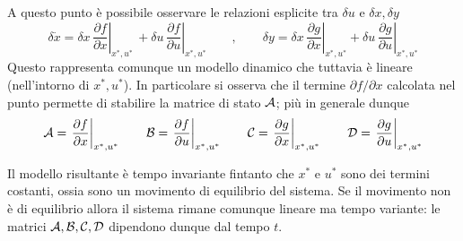  	A questo punto è possibile osservare le relazioni esplicite tra $\delta u$ e $\delta x, \delta y$
 	\[ \delta \dot x = \delta x \,\left. \frac{\partial f}{\partial x} \right|_{x^*,u^*}\, + \delta u \,\left. \frac{\partial f}{\partial u} \right|_{x^*,u^*} \qquad , \qquad 
 	\delta y = \delta x\,\left. \frac{\partial g}{\partial x} \right|_{x^*,u^*} + \delta u\,\left. \frac{\partial g}{\partial u} \right|_{x^*,u^*} \]
 	Questo rappresenta comunque un modello dinamico che tuttavia è lineare (nell'intorno di $x^*, u^*$). In particolare si osserva che il termine $\partial f  /\partial x$ calcolata nel punto permette di stabilire la matrice di stato $\mathcal A$; più in generale dunque
 	\[ \mathcal A= \left. \frac{\partial f}{\partial x} \right|_{x^*,u^*} \qquad \mathcal B =\left. \frac{\partial f}{\partial u} \right|_{x^*,u^*} \qquad \mathcal C = \left. \frac{\partial g}{\partial x} \right|_{x^*,u^*} \qquad \mathcal D= \left. \frac{\partial g}{\partial u} \right|_{x^*,u^*}\]
 	
 	Il modello risultante è tempo invariante fintanto che $x^*$ e $u^*$ sono dei termini costanti, ossia sono un movimento di equilibrio del sistema. Se il movimento non è di equilibrio allora il sistema rimane comunque lineare ma tempo variante: le matrici $\mathcal A,\mathcal B, \mathcal C, \mathcal D$ dipendono dunque dal tempo $t$.
 	
 	
 	
 	
 	
 	
 	
 	
 	
 	
 	
 	
 	
 	
 	
 	
 	
 	
 	
 	
 	
 	
 	
 	
 	
 	
 	
 	
 	
 	
 	
 	
 	
 	
 	
 	
 	
 	
 	
 	
 	
 	
 	
 	
 	
 	
 	
 	
 	